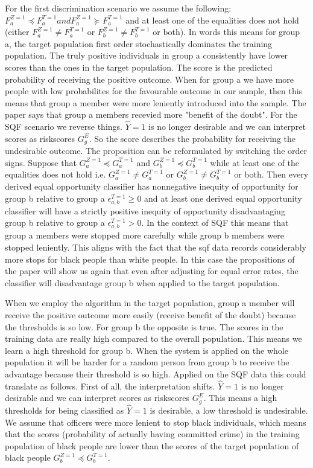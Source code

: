 For the first discrimination scenario we assume the following:
$F_a^{Z=1} \preceq F_a^{T=1} and F_a^{Z=1} \succeq F_a^{T=1}$ and at least one of the equalities does not hold (either $F_a^{Z=1} \ne F_a^{T=1}$ or $F_b^{Z=1} \ne F_b^{T=1}$ or both).
In words this means for group a, the target population first order stochastically dominates the training population. The truly positive individuals in group a consistently have lower scores than the ones in the target population. The score is the predicted probability of receiving the positive outcome. When for group a we have more people with low probabilites for the favourable outcome in our sample, then this means that group a member were more leniently introduced into the sample. The paper says that group a members recevied more "benefit of the doubt".
For the SQF scenario we reverse things. $\hat{Y} = 1$ is no longer desirable and we can interpret scores as riskscores $G_g^{E}$. So the score describes the probability for receiving the undesirable outcome. The proposition can be reformulated by switching the order signs.
Suppose that $G_a^{Z=1} \preceq G_a^{T=1}$ and $G_b^{Z=1} \preceq G_b^{T=1}$ while at least one of the equalities does not hold i.e. $G_a^{Z=1} \ne G_a^{T=1}$ or $G_b^{Z=1} \ne G_b^{T=1}$ or both. Then every derived equal opportunity classifier has nonnegative inequity of opportunity for group b relative to group a $\epsilon_{a,b}^{T=1} \geq 0$ and at least one derived equal opportunity classifier will have a strictly positive inequity of opportunity disadvantaging group b relative to group a $\epsilon_{a,b}^{T=1} > 0$.
In the context of SQF this means that group a members were stopped more carefully while group b members were stopped leniently. This aligns with the fact that the sqf data records considerably more stops for black people than white people. In this case the propositions of the paper will show us again that even after adjusting for equal error rates, the classifier will disadvantage group b when applied to the target population.


When we employ the algorithm in the target population, group a member will receive the positive outcome
 more easily (receive benefit of the doubt) because the thresholds is so low. For group b
 the opposite is true. The scores in the training data are really high compared to the overall population.
 This means we learn a high threshold for group b. When the system is applied on the whole population it will
 be harder for a random person from group b to receive the advantage because their threshold is so high.
Applied on the SQF data this could translate as follows. First of all, the interpretation shifts. $\hat{Y} = 1$ is 
no longer desirable and we can interpret scores as riskscores $G_g^{E}$. This means a high thresholds for being classified as $\hat{Y} = 1$ is desirable, a low
threshold is undesirable. We assume that officers were more lenient to stop black individuals, which means that the scores (probability of actually having committed crime) in the training population
of black people are lower than the scores of the target population of black people $G_b^{Z=1} \preceq G_b^{T=1}$.



